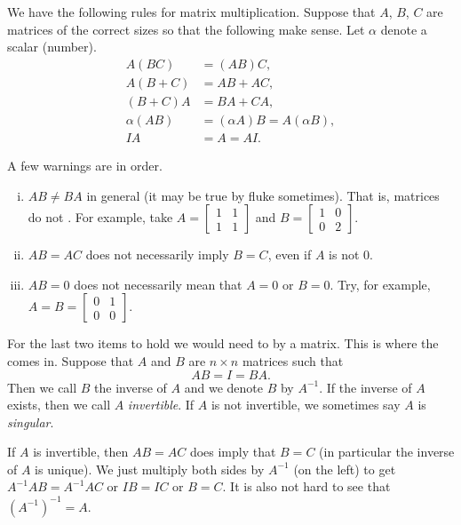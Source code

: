We have the following rules for matrix multiplication.  Suppose that
$A$, $B$, $C$ are matrices of the correct sizes so that the following
make sense.  Let $\alpha$ denote a scalar (number).
\begin{align*}
A(BC) & = (AB)C, \\
A(B+C) & = AB + AC, \\
(B+C)A & = BA + CA, \\
\alpha(AB) & = (\alpha A)B = A(\alpha B), \\
IA & = A = AI .
\end{align*}

\pagebreak[2]
A few warnings are in order.
\begin{enumerate}[(i)]
\item $AB \not= BA$ in general (it may be true by fluke sometimes).  That is,
matrices do not .
For example, take
$A = \left[ \begin{smallmatrix} 1 & 1 \\ 1 & 1 \end{smallmatrix} \right]$
and
$B = \left[ \begin{smallmatrix} 1 & 0 \\ 0 & 2 \end{smallmatrix} \right]$.
\item $AB = AC$ does not necessarily imply $B=C$, even if $A$ is not 0.
\item $AB = 0$ does not necessarily mean that $A=0$ or $B=0$.
Try, for example,
$A = B = \left[ \begin{smallmatrix} 0 & 1 \\ 0 & 0 \end{smallmatrix}
\right]$.
\end{enumerate}

For the last two items to hold we would need to  by
a matrix.  This is where the \emph{} comes in.
Suppose that $A$ and $B$ are $n \times n$ matrices such that
\begin{equation*}
AB = I = BA .
\end{equation*}
Then we call $B$ the inverse of $A$ and we denote $B$ by $A^{-1}$.
If the inverse of $A$ exists, then we call $A$
\emph{invertible}.
If $A$ is not invertible, we sometimes say $A$ is
\emph{singular}.

If $A$ is invertible, then $AB = AC$ does imply
that $B = C$ (in particular the inverse of $A$ is unique).
We just multiply both sides by $A^{-1}$ (on the left) to get
$A^{-1}AB = A^{-1}AC$ or $IB=IC$ or $B=C$.
It is also not hard to see that ${(A^{-1})}^{-1} = A$.

